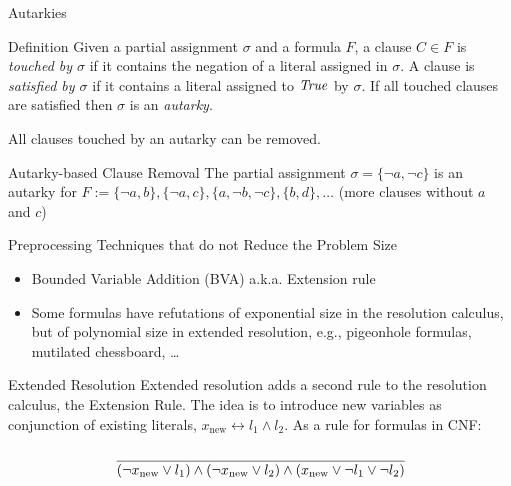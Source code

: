 \documentclass[t]{sdqbeamer}
\begin{document}
    
\begin{frame}{Autarkies}
\begin{block}{Definition}
Given a partial assignment $\sigma$ and a formula $F$, a clause $C \in F$ is \emph{touched by $\sigma$} if it contains the negation of a literal 
assigned in $\sigma$. A clause  is \emph{satisfied by $\sigma$} if it contains a literal assigned to $\mathit{True}$ by $\sigma$.
If all touched clauses are satisfied then $\sigma$ is an \emph{autarky}.
\end{block}

All clauses touched by an autarky can be removed.

\begin{exampleblock}{Autarky-based Clause Removal}
The partial assignment $\sigma = \{ \lnot a, \lnot c \}$ is an autarky for $F := \{ \lnot a, b \}, \{ \lnot a, c \}, \{ a, \lnot b, \lnot c \}, \{ b, d \}, \dots$ (more clauses without $a$ and $c$)
\end{exampleblock}
\end{frame}
    
    
\begin{frame}{Preprocessing Techniques that do not Reduce the Problem Size}
\begin{itemize}
\item Bounded Variable Addition (BVA) a.k.a. Extension rule
\item Some formulas have refutations of exponential size in the resolution calculus, but of polynomial size in extended resolution, e.g., pigeonhole formulas, mutilated chessboard, \dots
\end{itemize}
\begin{block}{Extended Resolution}
Extended resolution adds a second rule to the resolution calculus, the Extension Rule. The idea is to introduce
new variables as conjunction of existing literals, $x_\mathrm{new} \leftrightarrow l_1 \land l_2$. As a rule for formulas in CNF:
\vspace{-2ex}
$$ \cfrac{}{(\lnot x_\mathrm{new} \lor l_1) \land (\lnot x_\mathrm{new} \lor l_2) \land (x_\mathrm{new} \lor \lnot l_1 \lor \lnot l_ 2) } $$
\end{block}
\end{frame}
    
\end{document}
